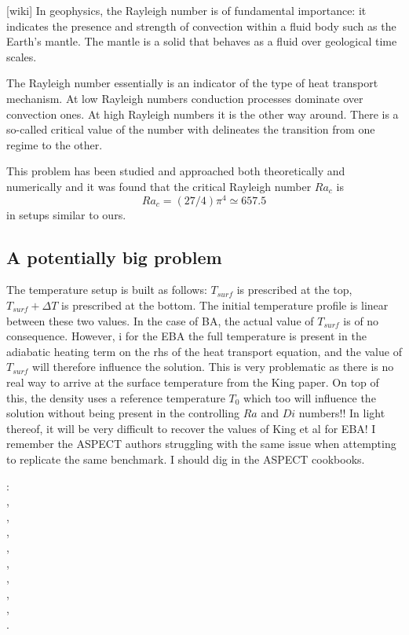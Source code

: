 [wiki] In geophysics, the Rayleigh number is of fundamental importance: 
it indicates the presence and strength of convection within a fluid body 
such as the Earth's mantle. The mantle is a solid that behaves as a fluid over geological time scales.

 The Rayleigh number essentially is an indicator of the type of heat transport mechanism. At low Rayleigh numbers conduction processes dominate over convection ones. At high Rayleigh numbers it is the other way around. There is a so-called critical value of the number with delineates the transition from one regime to the other. 

This problem has been studied and approached both theoretically and numerically \cite[e.g.]{tusc} and it was found that
the critical Rayleigh number $Ra_c$ is 
\[
Ra_c=(27/4)\pi^4 \simeq 657.5
\]
in setups similar to ours.


\vspace{1.5cm}

\subsection*{A potentially big problem}

The temperature setup is built as follows: $T_{surf}$ is prescribed at the top, 
$T_{surf}+\Delta T$ is prescribed at the bottom. The initial temperature profile 
is linear between these two values. 
In the case of BA, the actual value of $T_{surf}$ is of no consequence. However, i
for the EBA the full temperature is present in the adiabatic heating term on the 
rhs of the heat transport equation, and the value of $T_{surf}$ will therefore 
influence the solution. This is very problematic as there is no real way 
to arrive at the surface temperature from the King paper. On top of this, 
the density uses a reference temperature $T_0$ which too will influence the solution 
without being present in the controlling $Ra$ and $Di$ numbers!!
In light thereof, it will be very difficult to recover the values of King et al for EBA!
I remember the ASPECT authors struggling with the same issue when attempting to 
replicate the same benchmark. I should dig in the ASPECT cookbooks. 

\vspace{3cm}

\Literature: \\
,\\
,\\
,\\
,\\
,\\
,\\
,\\
,\\
.

